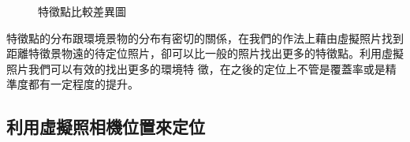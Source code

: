 	\begin{figure}
    	\begin{center}
    	\end{center}
    	\caption{特徵點比較差異圖 }
    	\label{fig:SIFT_Descriptor}
    \end{figure}
	
	特徵點的分布跟環境景物的分布有密切的關係，在我們的作法上藉由虛擬照片找到距離特徵景物遠的待定位照片，卻可以比一般的照片找出更多的特徵點。利用虛擬照片我們可以有效的找出更多的環境特
	徵，在之後的定位上不管是覆蓋率或是精準度都有一定程度的提升。

\subsection{利用虛擬照相機位置來定位}
